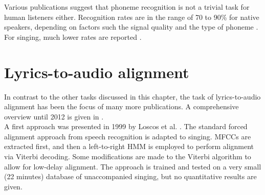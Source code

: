 Various publications suggest that phoneme recognition is not a trivial task for human listeners either. Recognition rates are in the range of 70 to 90\% for native speakers, depending on factors such the signal quality and the type of phoneme \cite{weber_smits}\cite{meyer_waechter}. For singing, much lower rates are reported \cite{hollien}.

\section{Lyrics-to-audio alignment}
In contrast to the other tasks discussed in this chapter, the task of lyrics-to-audio alignment has been the focus of many more publications. A comprehensive overview until 2012 is given in \cite{goto_alignment}.\\
A first approach was presented in 1999 by Loscos et al. \cite{loscos}. The standard forced alignment approach from speech recognition is adapted to singing. MFCCs are extracted first, and then a left-to-right HMM is employed to perform alignment via Viterbi decoding. Some modifications are made to the Viterbi algorithm to allow for low-delay alignment. The approach is trained and tested on a very small (22 minutes) database of unaccompanied singing, but no quantitative results are given.\\
